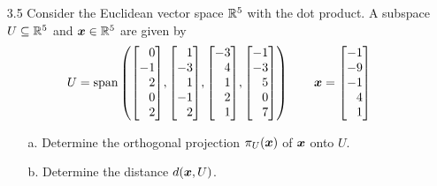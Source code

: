 \documentclass[11pt]{article}
\begin{document}
\begin{enumerate}
    \item[3.5] Consider the Euclidean vector space $\mathbb{R}^5$ with the dot product. A subspace $U \subseteq \mathbb{R}^5$ and
          $\boldsymbol{x} \in \mathbb{R}^5$ are given by
          \[
              U = \Span \args{
                  \begin{bmatrix*}[r]
                      0 \\ -1 \\ 2 \\ 0 \\ 2
                  \end{bmatrix*}
                  \! ,
                  \begin{bmatrix*}[r]
                      1 \\ -3 \\ 1 \\ -1 \\ 2
                  \end{bmatrix*}
                  \! ,
                  \begin{bmatrix*}[r]
                      -3 \\ 4 \\ 1 \\ 2 \\ 1
                  \end{bmatrix*}
                  \! ,
                  \begin{bmatrix*}[r]
                      -1 \\ -3 \\ 5 \\ 0 \\ 7
                  \end{bmatrix*}
              }
              \qquad
              \x =
              \begin{bmatrix*}[r]
                  -1 \\ -9 \\ -1 \\ 4 \\ 1
              \end{bmatrix*}
          \]

          \begin{enumerate}
              \item[a.] Determine the orthogonal projection $\pi_U(\boldsymbol{x})$ of $\boldsymbol{x}$ onto $U$.
              \item[b.] Determine the distance $d(\boldsymbol{x}, U)$.

                    \vspace{1em}


\end{enumerate}
\end{enumerate}
\end{document}
